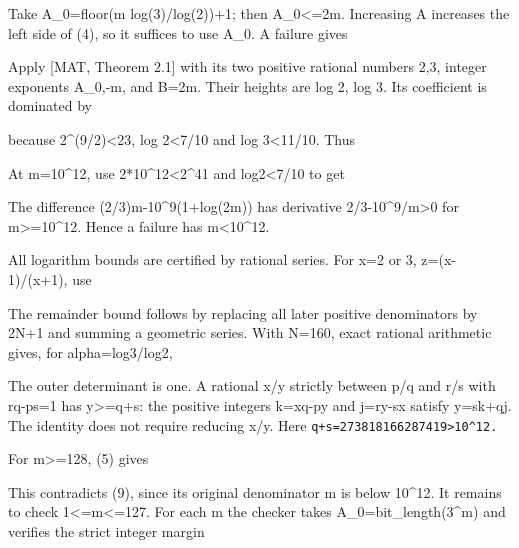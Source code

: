 Take A\_0=floor(m log(3)/log(2))+1; then A\_0\textless=2m. Increasing A
increases the left side of (4), so it suffices to use A\_0. A failure
gives


Apply {[}MAT, Theorem 2.1{]} with its two positive rational numbers 2,3,
integer exponents A\_0,-m, and B=2m. Their heights are log 2, log 3. Its
coefficient is dominated by


because 2\^{}(9/2)\textless23, log 2\textless7/10 and log
3\textless11/10. Thus


At m=10\^{}12, use 2*10\^{}12\textless2\^{}41 and log2\textless7/10 to
get


The difference (2/3)m-10\^{}9(1+log(2m)) has derivative
2/3-10\^{}9/m\textgreater0 for m\textgreater=10\^{}12. Hence a failure
has m\textless10\^{}12.

All logarithm bounds are certified by rational series. For x=2 or 3,
z=(x-1)/(x+1), use


The remainder bound follows by replacing all later positive denominators
by 2N+1 and summing a geometric series. With N=160, exact rational
arithmetic gives, for alpha=log3/log2,


The outer determinant is one. A rational x/y strictly between p/q and
r/s with rq-ps=1 has y\textgreater=q+s: the positive integers k=xq-py
and j=ry-sx satisfy y=sk+qj. The identity does not require reducing x/y.
Here \nolinkurl{q+s=273818166287419>10^12.}

For m\textgreater=128, (5) gives


This contradicts (9), since its original denominator m is below
10\^{}12. It remains to check 1\textless=m\textless=127. For each m the
checker takes A\_0=bit\_length(3\^{}m) and verifies the strict integer
margin

